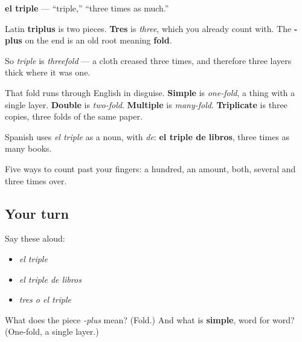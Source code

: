\begin{cousinweb}
\textbf{el triple} — \textquotedblleft{}triple,\textquotedblright{} \textquotedblleft{}three times as much.\textquotedblright{}

Latin \textbf{triplus} is two pieces. \textbf{Tres} is \emph{three}, which you already count with. The \textbf{-plus} on the end is an old root meaning \textbf{fold}.

So \emph{triple} is \emph{threefold} — a cloth creased three times, and therefore three layers thick where it was one.

That fold runs through English in disguise. \textbf{Simple} is \emph{one-fold}, a thing with a single layer. \textbf{Double} is \emph{two-fold}. \textbf{Multiple} is \emph{many-fold}. \textbf{Triplicate} is three copies, three folds of the same paper.

Spanish uses \emph{el triple} as a noun, with \emph{de}: \textbf{el triple de libros}, three times as many books.
\end{cousinweb}

\begin{grammarlens}[title={What you've built}]
Five ways to count past your fingers: a hundred, an amount, both, several and three times over.
\end{grammarlens}

\subsection*{Your turn}
Say these aloud:

\begin{itemize}
\raggedright
  \item \emph{el triple}
  \item \emph{el triple de libros}
  \item \emph{tres o el triple}
\end{itemize}

\begin{tcolorbox}[breakable,colback=teal!4,colframe=teal!35!black,title={Before you move on}]
What does the piece \emph{-plus} mean? (Fold.) And what is \textbf{simple}, word for word? (One-fold, a single layer.)
\end{tcolorbox}
